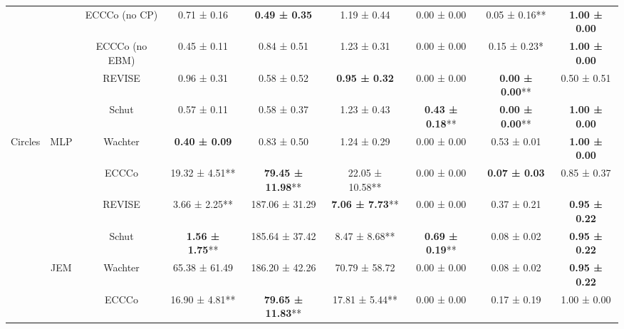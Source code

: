 \begin{table}
{\begin{tabular}[t]{ccccccccc}
 &  & ECCCo (no CP) & 0.71 ± 0.16\hphantom{*}\hphantom{*} & \textbf{0.49 ± 0.35}\hphantom{*}\hphantom{*} & 1.19 ± 0.44\hphantom{*}\hphantom{*} & 0.00 ± 0.00\hphantom{*}\hphantom{*} & 0.05 ± 0.16** & \textbf{1.00 ± 0.00}\hphantom{*}\hphantom{*}\\

 &  & ECCCo (no EBM) & 0.45 ± 0.11\hphantom{*}\hphantom{*} & 0.84 ± 0.51\hphantom{*}\hphantom{*} & 1.23 ± 0.31\hphantom{*}\hphantom{*} & 0.00 ± 0.00\hphantom{*}\hphantom{*} & 0.15 ± 0.23*\hphantom{*} & \textbf{1.00 ± 0.00}\hphantom{*}\hphantom{*}\\

 &  & REVISE & 0.96 ± 0.31\hphantom{*}\hphantom{*} & 0.58 ± 0.52\hphantom{*}\hphantom{*} & \textbf{0.95 ± 0.32}\hphantom{*}\hphantom{*} & 0.00 ± 0.00\hphantom{*}\hphantom{*} & \textbf{0.00 ± 0.00}** & 0.50 ± 0.51\hphantom{*}\hphantom{*}\\

 &  & Schut & 0.57 ± 0.11\hphantom{*}\hphantom{*} & 0.58 ± 0.37\hphantom{*}\hphantom{*} & 1.23 ± 0.43\hphantom{*}\hphantom{*} & \textbf{0.43 ± 0.18}** & \textbf{0.00 ± 0.00}** & \textbf{1.00 ± 0.00}\hphantom{*}\hphantom{*}\\

\multirow[t]{-12}{*}{\centering\arraybackslash Circles} & \multirow[t]{-6}{*}{\centering\arraybackslash MLP} & Wachter & \textbf{0.40 ± 0.09}\hphantom{*}\hphantom{*} & 0.83 ± 0.50\hphantom{*}\hphantom{*} & 1.24 ± 0.29\hphantom{*}\hphantom{*} & 0.00 ± 0.00\hphantom{*}\hphantom{*} & 0.53 ± 0.01\hphantom{*}\hphantom{*} & \textbf{1.00 ± 0.00}\hphantom{*}\hphantom{*}\\
\cmidrule{1-9}
 &  & ECCCo & 19.32 ± 4.51** & \textbf{79.45 ± 11.98}** & 22.05 ± 10.58** & 0.00 ± 0.00\hphantom{*}\hphantom{*} & \textbf{0.07 ± 0.03}\hphantom{*}\hphantom{*} & 0.85 ± 0.37\hphantom{*}\hphantom{*}\\

 &  & REVISE & 3.66 ± 2.25** & 187.06 ± 31.29\hphantom{*}\hphantom{*} & \textbf{7.06 ± 7.73}** & 0.00 ± 0.00\hphantom{*}\hphantom{*} & 0.37 ± 0.21\hphantom{*}\hphantom{*} & \textbf{0.95 ± 0.22}\hphantom{*}\hphantom{*}\\

 &  & Schut & \textbf{1.56 ± 1.75}** & 185.64 ± 37.42\hphantom{*}\hphantom{*} & 8.47 ± 8.68** & \textbf{0.69 ± 0.19}** & 0.08 ± 0.02\hphantom{*}\hphantom{*} & \textbf{0.95 ± 0.22}\hphantom{*}\hphantom{*}\\

 & \multirow[t]{-4}{*}{\centering\arraybackslash JEM} & Wachter & 65.38 ± 61.49\hphantom{*}\hphantom{*} & 186.20 ± 42.26\hphantom{*}\hphantom{*} & 70.79 ± 58.72\hphantom{*}\hphantom{*} & 0.00 ± 0.00\hphantom{*}\hphantom{*} & 0.08 ± 0.02\hphantom{*}\hphantom{*} & \textbf{0.95 ± 0.22}\hphantom{*}\hphantom{*}\\
\cmidrule{2-9}
 &  & ECCCo & 16.90 ± 4.81** & \textbf{79.65 ± 11.83}** & 17.81 ± 5.44** & 0.00 ± 0.00\hphantom{*}\hphantom{*} & 0.17 ± 0.19\hphantom{*}\hphantom{*} & 1.00 ± 0.00\hphantom{*}\hphantom{*}\\


\end{tabular}}
\end{table}
